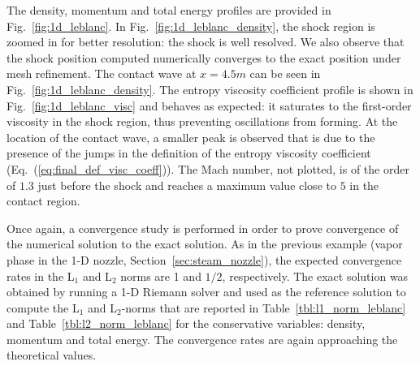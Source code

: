 \documentclass[preprint,10pt]{elsarticle}
\newcommand{\eqt}[1]{Eq.~(\ref{#1})}                     %
\newcommand{\fig}[1]{Fig.~\ref{#1}}                      %
\newcommand{\tbl}[1]{Table~\ref{#1}}                     %
\newcommand{\sct}[1]{Section~\ref{#1}}                   %
\begin{document}
%
The density, momentum and total energy profiles are provided in \fig{fig:1d_leblanc}. In \fig{fig:1d_leblanc_density}, the shock region is zoomed in for better resolution: the shock is well resolved. We also observe that the shock position computed numerically converges to the exact position under mesh refinement. The contact wave at $x=4.5m$ can be seen in \fig{fig:1d_leblanc_density}. The entropy viscosity coefficient profile is shown in \fig{fig:1d_leblanc_visc} and behaves as expected: it saturates to the first-order viscosity in the shock region, thus preventing oscillations from forming. At the location of the contact wave, a smaller peak is observed that is due to the presence of the jumps in the definition of the entropy viscosity coefficient (\eqt{eq:final_def_visc_coeff}).  The Mach number, not plotted, is of the order of $1.3$ just before the shock and reaches a maximum value close to $5$ in the contact region.

Once again, a convergence study is performed in order to prove convergence of the numerical solution to the exact solution. As in the previous example (vapor phase in the 1-D nozzle, \sct{sec:steam_nozzle}), the expected convergence rates in the L$_1$ and L$_2$ norms are 1 and $1/2$, respectively. The exact solution was obtained by running a 1-D Riemann solver and used as the reference solution to compute the L$_1$ and L$_2$-norms that are reported in \tbl{tbl:l1_norm_leblanc} and \tbl{tbl:l2_norm_leblanc} for the conservative variables: density, momentum and total energy. The convergence rates are again approaching the theoretical values.
\end{document}
